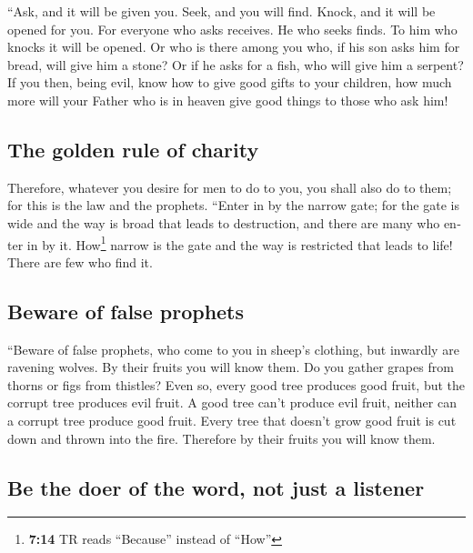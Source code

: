 \begin{paracol}{2}
\begin{otherlanguage}{english}
 ``Ask, and it will be given you. Seek, and you will find.
Knock, and it will be opened for you.  For everyone who
asks receives. He who seeks finds. To him who knocks it will be opened.
 Or who is there among you who, if his son asks him for
bread, will give him a stone?  Or if he asks for a fish,
who will give him a serpent?  If you then, being evil,
know how to give good gifts to your children, how much more will your
Father who is in heaven give good things to those who ask him!

\hypertarget{the-golden-rule-of-charity}{%
\subsection{The golden rule of
charity}\label{the-golden-rule-of-charity}}

 Therefore, whatever you desire for men to do to you, you
shall also do to them; for this is the law and the prophets.
 ``Enter in by the narrow gate; for the gate is wide and
the way is broad that leads to destruction, and there are many who enter
in by it.  How\footnote{\textbf{7:14} TR reads
  ``Because'' instead of ``How''} narrow is the gate and the way is
restricted that leads to life! There are few who find it.

\hypertarget{beware-of-false-prophets}{%
\subsection{Beware of false prophets}\label{beware-of-false-prophets}}

 ``Beware of false prophets, who come to you in sheep's
clothing, but inwardly are ravening wolves.  By their
fruits you will know them. Do you gather grapes from thorns or figs from
thistles?  Even so, every good tree produces good fruit,
but the corrupt tree produces evil fruit.  A good tree
can't produce evil fruit, neither can a corrupt tree produce good fruit.
 Every tree that doesn't grow good fruit is cut down and
thrown into the fire.  Therefore by their fruits you will
know them.

\hypertarget{be-the-doer-of-the-word-not-just-a-listener}{%
\subsection{Be the doer of the word, not just a
listener}\label{be-the-doer-of-the-word-not-just-a-listener}}


\end{otherlanguage}
\end{paracol}
